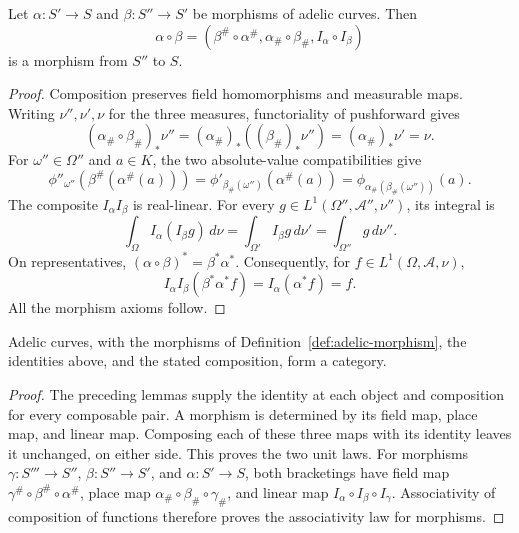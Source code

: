 \begin{lemma}
\label{lem:adelic-morphism-comp}
\leanok
{}
Let $\alpha:S'\to S$ and $\beta:S''\to S'$ be morphisms of
adelic curves. Then
\[
 \alpha\circ\beta=
 (\beta^\#\circ\alpha^\#,
  \alpha_\#\circ\beta_\#,
  I_\alpha\circ I_\beta)
\]
is a morphism from $S''$ to $S$.
\end{lemma}
\begin{proof}
Composition preserves field homomorphisms and measurable maps.
Writing $\nu'',\nu',\nu$ for the three measures, functoriality of
pushforward gives
\[
 (\alpha_\#\circ\beta_\#)_*\nu''
 = (\alpha_\#)_*((\beta_\#)_*\nu'')
 = (\alpha_\#)_*\nu'=\nu.
\]
For $\omega''\in\Omega''$ and $a\in K$, the two absolute-value
compatibilities give
\[
 \phi''_{\omega''}(\beta^\#(\alpha^\#(a)))
 =\phi'_{\beta_\#(\omega'')}(\alpha^\#(a))
 =\phi_{\alpha_\#(\beta_\#(\omega''))}(a).
\]
The composite $I_\alpha I_\beta$ is real-linear. For every
$g\in L^1(\Omega'',\mathcal A'',\nu'')$, its integral is
\[
 \int_\Omega I_\alpha(I_\beta g)\,d\nu
 =\int_{\Omega'}I_\beta g\,d\nu'
 =\int_{\Omega''}g\,d\nu''.
\]
On representatives,
$(\alpha\circ\beta)^*=\beta^*\alpha^*$.
Consequently, for $f\in L^1(\Omega,\mathcal A,\nu)$,
\[
 I_\alpha I_\beta(\beta^*\alpha^*f)
 =I_\alpha(\alpha^*f)=f.
\]
All the morphism axioms follow.
\end{proof}

\begin{theorem}
\label{thm:adelic-curve-category}
\leanok
{}
Adelic curves, with the morphisms of Definition~\ref{def:adelic-morphism},
the identities above, and the stated composition, form a category.
\end{theorem}
\begin{proof}
The preceding lemmas supply the identity at each object and composition
for every composable pair. A morphism is determined by its field map,
place map, and linear map. Composing each of these three maps with its
identity leaves it unchanged, on either side. This proves the two unit
laws. For morphisms $\gamma:S'''\to S''$, $\beta:S''\to S'$, and
$\alpha:S'\to S$, both bracketings have field map
$\gamma^\#\circ\beta^\#\circ\alpha^\#$, place map
$\alpha_\#\circ\beta_\#\circ\gamma_\#$, and linear map
$I_\alpha\circ I_\beta\circ I_\gamma$.
Associativity of composition of functions therefore proves the
associativity law for morphisms.
\end{proof}

